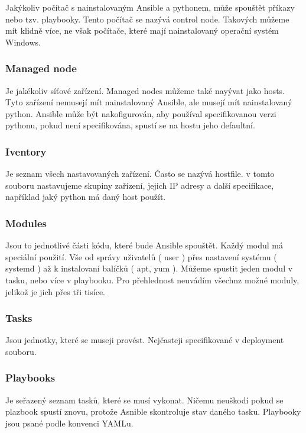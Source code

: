 Jakýkoliv počítač s nainstalovaným Ansible a pythonem, může spouštět příkazy nebo tzv. playbooky. Tento počítač se nazývá control node. Takových můžeme mít klidně více, ne však počítače, které mají nainstalovaný operační systém Windows. 

\subsubsection{Managed node}

Je jakékoliv síťové zařízení. Managed nodes můžeme také nayývat jako hosts. Tyto zařízení nemusejí mít nainstalovaný Ansible, ale musejí mít nainstalovaný python. Ansible může být nakofigurován, aby používal specifikovanou verzi pythonu, pokud není specifikována, spustí se na hostu jeho defaultní.

\subsubsection{Iventory}

Je seznam všech nastavovaných zařízení. Často se nazývá hostfile. v tomto souboru nastavujeme skupiny zařízení, jejich IP adresy a další specifikace, například jaký python má daný host použít. 

\subsubsection{Modules}

Jsou to jednotlivé části kódu, které bude Ansible spouštět. Každý modul má speciální použití. Vše od správy uživatelů ( user ) přes nastavení systému ( systemd ) až k instalovaní balíčků ( apt, yum ). Můžeme spustit jeden modul v tasku, nebo více v playbooku. Pro přehlednost neuvádím všechnz možné moduly, jelikož je jich přes tři tisíce. 

\subsubsection{Tasks}

Jsou jednotky, které se museji provést. Nejčasteji specifikované v deployment souboru. 

\subsubsection{Playbooks}

Je seřazený seznam tasků, které se musí vykonat. Ničemu neuškodí pokud se plazbook spustí znovu, protože Asnible skontroluje stav daného tasku. Playbooky jsou psané podle konvenci YAMLu. 
